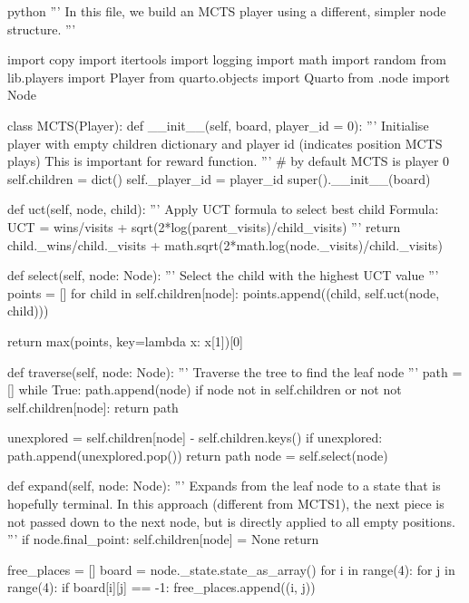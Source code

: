 \begin{mintedbox}{python}
'''
In this file, we build an MCTS player using a different, simpler node structure.
'''

import copy
import itertools
import logging
import math
import random
from lib.players import Player
from quarto.objects import Quarto
from .node import Node

class MCTS(Player):
    def __init__(self, board, player_id = 0):
        '''
        Initialise player with empty children dictionary
        and player id (indicates position MCTS plays)
        This is important for reward function.
        '''
        # by default MCTS is player 0
        self.children = dict()
        self._player_id = player_id
        super().__init__(board)

    def uct(self, node, child):
        '''
        Apply UCT formula to select best child
        Formula: UCT = wins/visits + sqrt(2*log(parent_visits)/child_visits)
        '''
        return child._wins/child._visits + math.sqrt(2*math.log(node._visits)/child._visits)

    def select(self, node: Node):
        '''
        Select the child with the highest UCT value
        '''
        points = []
        for child in self.children[node]:
            points.append((child, self.uct(node, child)))

        return max(points, key=lambda x: x[1])[0]

    def traverse(self, node: Node):
        '''
        Traverse the tree to find the leaf node
        '''
        path = []
        while True:
            path.append(node)
            if node not in self.children or not not self.children[node]:
                return path

            unexplored = self.children[node] - self.children.keys()
            if unexplored:
                path.append(unexplored.pop())
                return path
            node = self.select(node)

    def expand(self, node: Node):
        '''
        Expands from the leaf node to a state that is hopefully terminal. In this approach (different from MCTS1), the next piece is not passed down to the next node, but is directly applied to all empty positions.
        '''
        if node.final_point:
            self.children[node] = None
            return

        free_places = []
        board = node._state.state_as_array()
        for i in range(4):
            for j in range(4):
                if board[i][j] == -1:
                    free_places.append((i, j))


\end{mintedbox}
